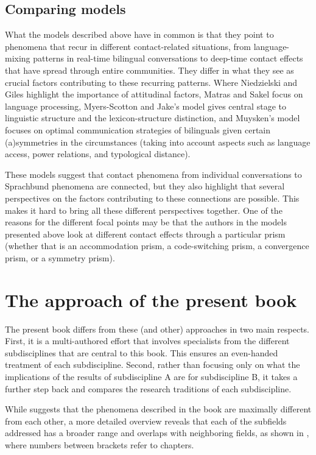 \documentclass[output=paper]{langscibook}
\begin{document}
\subsection{Comparing models}
What the models described above have in common is that they point to phenomena that recur in different contact-related situations, from language-mixing patterns in real-time bilingual conversations to deep-time contact effects that have spread through entire communities. They differ in what they see as crucial factors contributing to these recurring patterns. Where Niedzielski
and Giles \parencite*{niedzielskietal1996linguistic} highlight the importance of attitudinal factors, Matras and Sakel \parencite*{matras&sakel2007} focus on language processing, Myers-Scotton and Jake's \parencite*{myersetal2009universal} model gives central stage to linguistic structure and the lexicon-structure distinction, and Muysken's model focuses on optimal communication strategies of bilinguals given certain (a)symmetries in the circumstances (taking into account aspects such as language access, power relations, and typological distance).

These models suggest that contact phenomena from individual conversations to Sprachbund phenomena are connected, but they also highlight that several perspectives on the factors contributing to these connections are possible. This makes it hard to bring all these different perspectives together. One of the reasons for the different focal points may be that the authors in the models presented above look at different contact effects through a particular prism (whether that is an accommodation prism, a code-switching prism, a convergence prism, or a symmetry prism). 

\section{The approach of the present book} \label{framework}

The present book differs from these (and other) approaches in two main respects. First, it is a multi-authored effort that involves specialists from the different subdisciplines that are central to this book. This ensures an even-handed treatment of each subdiscipline. Second, rather than focusing only on what the implications of the results of subdiscipline A are for subdiscipline B, it takes a further step back and compares the research traditions of each subdiscipline. 

While  suggests that the phenomena described in the book are maximally different from each other, a more detailed overview reveals that each of the subfields addressed has a broader range and overlaps with neighboring fields, as shown in , where numbers between brackets refer to chapters.
\end{document}
